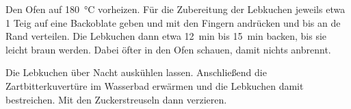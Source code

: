 \begin{recipeDP}
{        \step Den Ofen auf \SI{180}{\celsius} vorheizen. Für die Zubereitung der Lebkuchen jeweils etwa \SI{1}{\TL} Teig auf eine Backoblate geben und mit den Fingern andrücken und bis an de Rand verteilen. Die Lebkuchen dann etwa \SI{12}{\minute} bis \SI{15}{\minute} backen, bis sie leicht braun werden. Dabei öfter in den Ofen schauen, damit nichts anbrennt.

        \step Die Lebkuchen über Nacht auskühlen lassen. Anschließend die Zartbitterkuvertüre im Wasserbad erwärmen und die Lebkuchen damit bestreichen. Mit den Zuckerstreuseln dann verzieren.
    }



\end{recipeDP}
